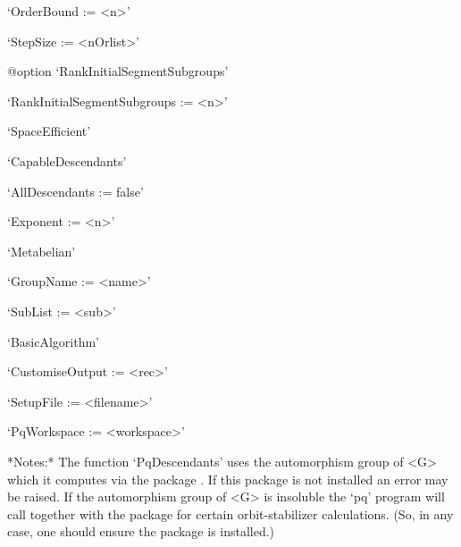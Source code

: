 \item{}`OrderBound := <n>'

\item{}`StepSize := <nOrlist>'

%
{@option \noexpand`RankInitialSegmentSubgroups'}
\item{}`RankInitialSegmentSubgroups := <n>'

\item{}`SpaceEfficient'

\item{}`CapableDescendants'

\item{}`AllDescendants := false'

\item{}`Exponent := <n>'

\item{}`Metabelian'

\item{}`GroupName := <name>'

\item{}`SubList := <sub>'

\item{}`BasicAlgorithm'

\item{}`CustomiseOutput := <rec>'

\item{}`SetupFile := <filename>'

\item{}`PqWorkspace := <workspace>'

\endlist

*Notes:*
The function `PqDescendants' uses the automorphism group of <G> which  it
computes via the package {\AutPGrp}. If this package is not installed  an
error may be raised. If the automorphism group of <G>  is  insoluble  the
`pq' program will call {\GAP} together with  the  {\AutPGrp}  package  for
certain orbit-stabilizer calculations.  (So,  in  any  case,  one  should
ensure the {\AutPGrp} package is installed.)

